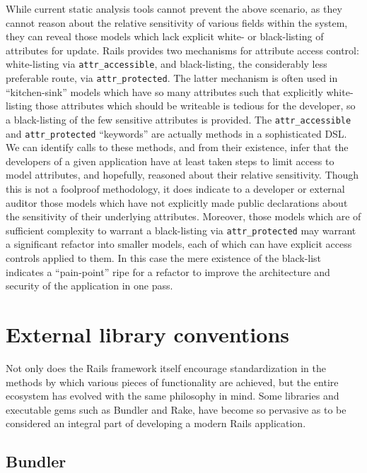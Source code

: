 \documentclass[conference]{IEEEtran}
\begin{document}
While current static analysis tools cannot prevent the above scenario, as they
cannot reason about the relative sensitivity of various fields within the system,
they can reveal those models which lack explicit white- or black-listing of attributes for
update.  Rails provides two mechanisms for attribute access control: white-listing via
\texttt{attr\_accessible}, and black-listing, the considerably less preferable route, via
\texttt{attr\_protected}.  The latter mechanism is often used in ``kitchen-sink'' models
which have so many attributes such that explicitly white-listing those attributes which should
be writeable is tedious for the developer, so a black-listing of the few sensitive
attributes is provided.  The \texttt{attr\_accessible} and \texttt{attr\_protected}
``keywords'' are actually methods in a sophisticated DSL.  We can identify calls to these
methods, and from their existence, infer that the developers of a given application have
at least taken steps to limit access to model attributes, and hopefully, reasoned about
their relative sensitivity. Though this is not a foolproof methodology,  it does indicate
to a developer or external auditor those models which have not explicitly made public
declarations about the sensitivity of their underlying attributes.
Moreover, those models which are of sufficient complexity to warrant a black-listing via
\texttt{attr\_protected} may warrant a significant refactor into smaller models, each of
which can have explicit access controls applied to them.  In this case the mere existence
of the black-list indicates a ``pain-point'' ripe for a refactor to improve the
architecture and security of the application in one pass.

\section{External library conventions}

Not only does the Rails framework itself encourage standardization in the
methods by which various pieces of functionality are achieved, but the entire
ecosystem has evolved with the same philosophy in mind.  Some libraries and
executable gems such as Bundler and Rake, have become so pervasive as to be
considered an integral part of developing a modern Rails application.

\subsection{Bundler}
\end{document}

